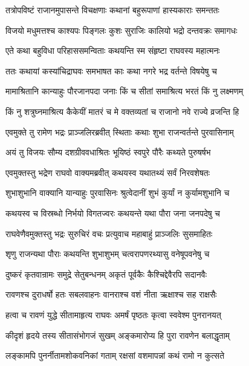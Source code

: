 \twolineshloka
{तत्रोपविष्टं राजानमुपासन्ते विचक्षणाः}
{कथानां बहुरूपाणां हास्यकाराः समन्ततः} %

\twolineshloka
{विजयो मधुमत्तश्च काश्यपः पिङ्गलः कुशः}
{सुराजिः कालियो भद्रो दन्तवक्रः समागधः} %

\twolineshloka
{एते कथा बहुविधा परिहाससमन्विताः}
{कथयन्ति स्म संहृष्टा राघवस्य महात्मनः} %

\twolineshloka
{ततः कथायां कस्यांचिद्राघवः समभाषत}
{काः कथा नगरे भद्र वर्तन्ते विषयेषु च} %

\twolineshloka
{मामाश्रितानि कान्याहुः पौरजानपदा जनाः}
{किं च सीतां समाश्रित्य भरतं किं नु लक्ष्मणम्} %

\twolineshloka
{किं नु शत्रुघ्नमाश्रित्य कैकेयीं मातरं च मे}
{वक्तव्यतां च राजानो नवे राज्ये व्रजन्ति हि} %

\twolineshloka
{एवमुक्ते तु रामेण भद्रः प्राञ्जलिरब्रवीत्}
{स्थिताः कथाः शुभा राजन्वर्तन्ते पुरवासिनाम्} %

\twolineshloka
{अयं तु विजयः सौम्य दशग्रीववधाश्रितः}
{भूयिष्ठं स्वपुरे पौरैः कथ्यते पुरुषर्षभ} %

\twolineshloka
{एवमुक्तस्तु भद्रेण राघवो वाक्यमब्रवीत्}
{कथयस्व यथातथ्यं सर्वं निरवशेषतः} %

\twolineshloka
{शुभाशुभानि वाक्यानि यान्याहुः पुरवासिनः}
{श्रुत्वेदानीं शुभं कुर्यां न कुर्यामशुभानि च} %

\twolineshloka
{कथयस्व च विस्रब्धो निर्भयो विगतज्वरः}
{कथयन्ते यथा पौरा जना जनपदेषु च} %

\twolineshloka
{राघवेणैवमुक्तस्तु भद्रः सुरुचिरं वचः}
{प्रत्युवाच महाबाहुं प्राञ्जलिः सुसमाहितः} %

\twolineshloka
{शृणु राजन्यथा पौराः कथयन्ति शुभाशुभम्}
{चत्वरापणरथ्यासु वनेषूपवनेषु च} %

\twolineshloka
{दुष्करं कृतवान्रामः समुद्रे सेतुबन्धनम्}
{अकृतं पूर्वकैः कैश्चिद्देवैरपि सदानवैः} %

\twolineshloka
{रावणश्च दुराधर्षो हतः सबलवाहनः}
{वानराश्च वशं नीता ऋक्षाश्च सह राक्षसैः} %

\twolineshloka
{हत्वा च रावणं युद्धे सीतामाहृत्य राघवः}
{अमर्षं पृष्ठतः कृत्वा स्ववेश्म पुनरानयत्} %

\twolineshloka
{कीदृशं हृदये तस्य सीतासंभोगजं सुखम्}
{अङ्कमारोप्य हि पुरा रावणेन बलाद्धृताम्} %

\twolineshloka
{लङ्कामपि पुनर्नीतामशोकवनिकां गताम्}
{रक्षसां वशमापन्नां कथं रामो न कुत्सते} %

